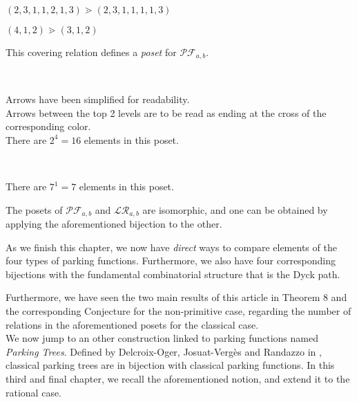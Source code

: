 \begin{example}[$a > b : a = 7, b = 3$]
    $(2, 3, 1, 1, 2, 1, 3) \gtrdot (2, 3, 1, 1, 1, 1, 3)$    
\end{example}

\begin{example}[$a < b : a = 3, b = 5$]
    $(4, 1, 2) \gtrdot (3, 1, 2)$    
\end{example}

\begin{prop}
    This covering relation defines a \emph{poset}
    for $\mathcal{PF}_{a,b}$.
\end{prop}

\begin{example}
    ~\\
    \begin{center}
        
        Arrows have been simplified for readability.\\
        Arrows between the top 2 levels are to be read
        as ending at the cross of the corresponding color.\\
        There are $2^4 = 16$ elements in this poset.
    \end{center}
\end{example}

\begin{example}
    ~\\
    \begin{center}
        
        There are $7^1 = 7$ elements in this poset.
    \end{center}
\end{example}

\begin{rem}
    The posets of $\mathcal{PF}_{a,b}$ and $\mathcal{LR}_{a,b}$
    are isomorphic, and one can be obtained by
    applying the aforementioned bijection to the other.
\end{rem}

As we finish this chapter, we now have \emph{direct} ways
to compare elements of the four types of parking functions.
Furthermore, we also have four corresponding bijections with
the fundamental combinatorial structure that is the Dyck path.

Furthermore, we have seen the two main results of this article
in Theorem 8 and the corresponding Conjecture for the
non-primitive case, regarding the number of relations in the
aforementioned posets for the classical case.\\

We now jump to an other construction linked to parking functions
named \emph{Parking Trees}.
Defined by Delcroix-Oger, Josuat-Vergès and Randazzo in
\cite{ref9}, classical parking trees are in bijection with
classical parking functions.
In this third and final chapter, we recall the aforementioned
notion, and extend it to the rational case.